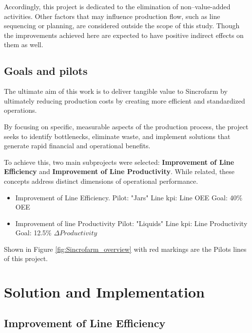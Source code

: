 \documentclass[]{article}
\begin{document}
Accordingly, this project is dedicated to the elimination of non–value-added activities. Other factors that may influence production flow, such as line sequencing or planning, are considered outside the scope of this study. Though the improvements achieved here are expected to have positive indirect effects on them as well.

\subsection{Goals and pilots}
The ultimate aim of this work is to deliver tangible value to Sincrofarm by ultimately reducing production costs by creating more efficient and standardized operations. 

By focusing on specific, measurable aspects of the production process, the project seeks to identify bottlenecks, eliminate waste, and implement solutions that generate rapid financial and operational benefits.

To achieve this, two main subprojects were selected: \textbf{Improvement of Line Efficiency} and \textbf{Improvement of Line Productivity}. While related, these concepts address distinct dimensions of operational performance.

\begin{itemize}
  \item Improvement of Line Efficiency.
    \subitem Pilot: "Jars" Line
    \subitem \gls{kpi}: Line OEE
    \subitem Goal: 40\% OEE
  \item Improvement of line Productivity
    \subitem Pilot: "Liquids" Line
    \subitem \gls{kpi}: Line Productivity
    \subitem Goal: 12.5\% $\Delta Productivity$
\end{itemize}

Shown in Figure \ref{fig:Sincrofarm_overview} with red markings are the Pilots lines of this project.

\clearpage
\newpage
\section{Solution and Implementation}
\subsection{Improvement of Line Efficiency}\label{OEE_improve}
\end{document}
